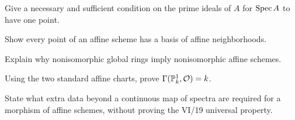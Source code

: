 \begin{exercise}\label{ex:vi18-22}
Give a necessary and sufficient condition on the prime ideals of $A$ for $\operatorname{Spec} A$ to have one point.
\end{exercise}

\begin{exercise}\label{ex:vi18-23}
Show every point of an affine scheme has a basis of affine neighborhoods.
\end{exercise}

\begin{exercise}\label{ex:vi18-24}
Explain why nonisomorphic global rings imply nonisomorphic affine schemes.
\end{exercise}

\begin{exercise}\label{ex:vi18-25}
Using the two standard affine charts, prove $\Gamma(\mathbb P^1_k,\mathcal O)=k$.
\end{exercise}

\begin{exercise}[Boundary to VI/19]\label{ex:vi18-26}
State what extra data beyond a continuous map of spectra are required for a morphism of affine schemes, without proving the VI/19 universal property.
\end{exercise}

